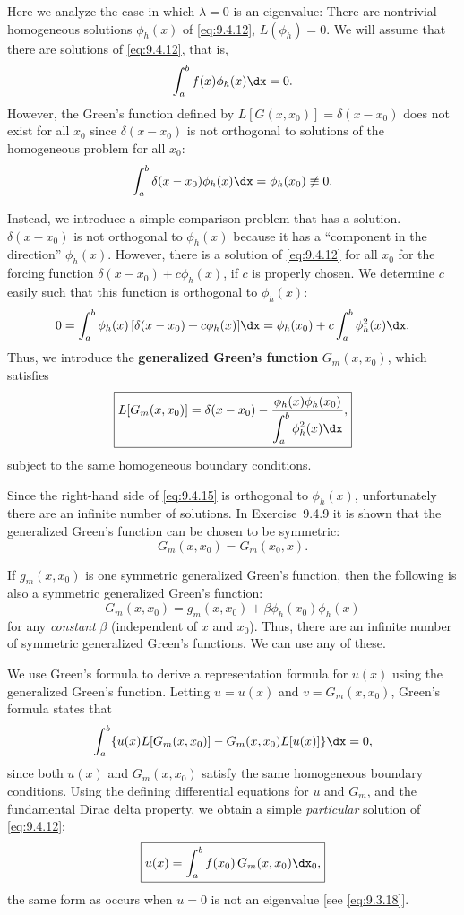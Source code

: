 Here we analyze the case in which $\lambda = 0$ is an eigenvalue: There are nontrivial homogeneous solutions $\phi_h(x)$ of \eqref{eq:9.4.12}, $L(\phi_h) = 0$.  We will assume that there are solutions of \eqref{eq:9.4.12}, that is,
\begin{equation}
\label{eq:9.4.14}
\int_a^b f(x)\phi_h(x)\dx = 0.
\end{equation}
However, the Green's function defined by $L[G(x,x_0)] = \delta(x-x_0)$ does not exist for all $x_0$ since $\delta(x-x_0)$ is not orthogonal to solutions of the homogeneous problem for all $x_0$:
\[
\int_a^b \delta(x-x_0)\phi_h(x)\dx = \phi_h(x_0) \not\equiv 0.
\]

Instead, we introduce a simple comparison problem that has a solution.  $\delta(x-x_0)$ is not orthogonal to $\phi_h(x)$ because it has a ``component in the direction'' $\phi_h(x)$.  However, there is a solution of \eqref{eq:9.4.12} for all $x_0$ for the forcing function $\delta(x-x_0) + c\phi_h(x)$, if $c$ is properly chosen.  We determine $c$ easily such that this function is orthogonal to $\phi_h(x)$:
\[
0 = \int_a^b \phi_h(x)\,[\delta(x-x_0) + c\phi_h(x)]\dx = \phi_h(x_0) + c\int_a^b \phi_h^2(x)\dx.
\]
Thus, we introduce the \textbf{generalized Green's function} $G_m(x,x_0)$, which satisfies
\begin{equation}
\label{eq:9.4.15}
\boxed{L[G_m(x,x_0)] = \delta(x - x_0) - \frac{\phi_h(x)\phi_h(x_0)}{\displaystyle\int_a^b \phi_h^2(x)\dx},}
\end{equation}
subject to the same homogeneous boundary conditions.

Since the right-hand side of \eqref{eq:9.4.15} is orthogonal to $\phi_h(x)$, unfortunately there are an infinite number of solutions.  In Exercise~9.4.9 it is shown that the generalized Green's function can be chosen to be symmetric:
\begin{equation}
\label{eq:9.4.16}
\boxed{G_m(x,x_0) = G_m(x_0,x).}
\end{equation}

If $g_m(x,x_0)$ is one symmetric generalized Green's function, then the following is also a symmetric generalized Green's function:
\[
G_m(x,x_0) = g_m(x,x_0) + \beta\phi_h(x_0)\phi_h(x)
\]
for any \emph{constant} $\beta$ (independent of $x$ and $x_0$).  Thus, there are an infinite number of symmetric generalized Green's functions.  We can use any of these.

We use Green's formula to derive a representation formula for $u(x)$ using the generalized Green's function.  Letting $u = u(x)$ and $v = G_m(x,x_0)$, Green's formula states that
\[
\int_a^b \{u(x)L[G_m(x,x_0)] - G_m(x,x_0)L[u(x)]\}\dx = 0,
\]
since both $u(x)$ and $G_m(x,x_0)$ satisfy the same homogeneous boundary conditions.  Using the defining differential equations for $u$ and $G_m$, and the fundamental Dirac delta property, we obtain a simple \emph{particular} solution of \eqref{eq:9.4.12}:
\begin{equation}
\label{eq:9.4.17}
\boxed{u(x) = \int_a^b f(x_0)\,G_m(x,x_0)\dx_0,}
\end{equation}
the same form as occurs when $u = 0$ is not an eigenvalue [see \eqref{eq:9.3.18}].

